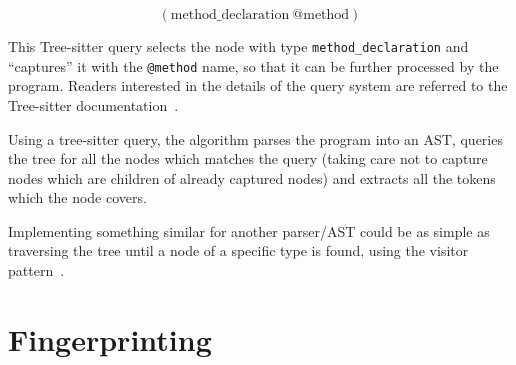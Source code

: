 \begin{equation}
    (\mathrm{method\_declaration\ } \text{@method})
\end{equation}

This Tree-sitter query selects the node with type \verb|method_declaration| and
``captures'' it with the \verb|@method| name, so that it can be further processed by the
program. Readers interested in the details of the query system are referred to the
Tree-sitter documentation~\cite{treesitter}.

Using a tree-sitter query, the algorithm parses the program into an AST, queries the tree
for all the nodes which matches the query (taking care not to capture nodes which are
children of already captured nodes) and extracts all the tokens which the node covers.


Implementing something similar for another parser/AST could be as simple as traversing
the tree until a node of a specific type is found, using the visitor pattern~\cite[366]{GangOfFour}.


\section{Fingerprinting}


